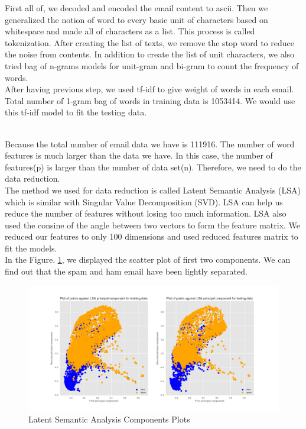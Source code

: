 
First all of, we decoded and encoded the email content to ascii. Then we generalized the notion of word to every basic unit of characters based on whitespace and made all of characters as a list. This process is called tokenization. After creating the list of texts, we remove the stop word to reduce the noise from contents. In addition to create the list of unit characters, we also tried bag of n-grams models for unit-gram and bi-gram to count the frequency of words.\\

After having previous step, we used tf-idf to give weight of words in each email. Total number of 1-gram bag of words in training data is 1053414. We would use this tf-idf model to fit the testing data. \\\

Because the total number of email data we have is 111916. The number of word features is much larger than the data we have. In this case, the number of features(p) is larger than the number of data set(n). Therefore, we need to do the data reduction.\\

The method we used for data reduction is called Latent Semantic Analysis (LSA) which is similar with Singular Value Decomposition (SVD). LSA can help us reduce the number of features without losing too much information. LSA also used the consine of the angle between two vectors to form the feature matrix. We reduced our features to only 100 dimensions and used reduced features matrix to fit the models.\\

In the Figure. \ref{FE}, we displayed the scatter plot of first two components. We can find out that the spam and ham email have been lightly separated.

\begin{figure}[ht!]
    \centering
    \includegraphics[scale=0.3]{data_reduction_cp12.png}
    \caption{Latent Semantic Analysis Components Plots}
    \label{FE}
\end{figure}

